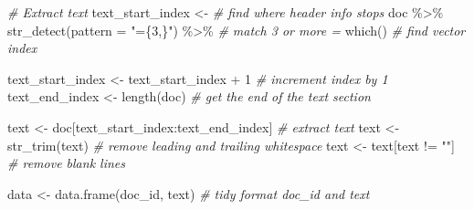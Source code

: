 \documentclass[
]{article}
\newenvironment{Shaded}{\begin{snugshade}}{\end{snugshade}}
\newcommand{\AttributeTok}[1]{\textcolor[rgb]{0.77,0.63,0.00}{#1}}
\newcommand{\CommentTok}[1]{\textcolor[rgb]{0.56,0.35,0.01}{\textit{#1}}}
\newcommand{\DecValTok}[1]{\textcolor[rgb]{0.00,0.00,0.81}{#1}}
\newcommand{\FunctionTok}[1]{\textcolor[rgb]{0.00,0.00,0.00}{#1}}
\newcommand{\NormalTok}[1]{#1}
\newcommand{\OtherTok}[1]{\textcolor[rgb]{0.56,0.35,0.01}{#1}}
\newcommand{\SpecialCharTok}[1]{\textcolor[rgb]{0.00,0.00,0.00}{#1}}
\newcommand{\StringTok}[1]{\textcolor[rgb]{0.31,0.60,0.02}{#1}}
\begin{document}
\begin{Shaded}
\begin{Highlighting}[]
  \CommentTok{\# Extract \textasciigrave{}text\textasciigrave{}}
\NormalTok{  text\_start\_index }\OtherTok{\textless{}{-}} \CommentTok{\# find where header info stops}
\NormalTok{    doc }\SpecialCharTok{\%\textgreater{}\%} 
    \FunctionTok{str\_detect}\NormalTok{(}\AttributeTok{pattern =} \StringTok{"=\{3,\}"}\NormalTok{) }\SpecialCharTok{\%\textgreater{}\%} \CommentTok{\# match 3 or more \textasciigrave{}=\textasciigrave{}}
    \FunctionTok{which}\NormalTok{() }\CommentTok{\# find vector index}
  
\NormalTok{  text\_start\_index }\OtherTok{\textless{}{-}}\NormalTok{ text\_start\_index }\SpecialCharTok{+} \DecValTok{1} \CommentTok{\# increment index by 1}
\NormalTok{  text\_end\_index }\OtherTok{\textless{}{-}} \FunctionTok{length}\NormalTok{(doc) }\CommentTok{\# get the end of the text section}
  
\NormalTok{  text }\OtherTok{\textless{}{-}}\NormalTok{ doc[text\_start\_index}\SpecialCharTok{:}\NormalTok{text\_end\_index] }\CommentTok{\# extract text}
\NormalTok{  text }\OtherTok{\textless{}{-}} \FunctionTok{str\_trim}\NormalTok{(text) }\CommentTok{\# remove leading and trailing whitespace}
\NormalTok{  text }\OtherTok{\textless{}{-}}\NormalTok{ text[text }\SpecialCharTok{!=} \StringTok{""}\NormalTok{] }\CommentTok{\# remove blank lines}
  
\NormalTok{  data }\OtherTok{\textless{}{-}} \FunctionTok{data.frame}\NormalTok{(doc\_id, text) }\CommentTok{\# tidy format \textasciigrave{}doc\_id\textasciigrave{} and \textasciigrave{}text\textasciigrave{}}
  

\end{Highlighting}
\end{Shaded}
\end{document}
